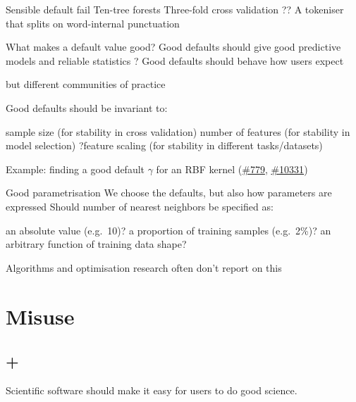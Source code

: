 \documentclass[aspectratio=169, 22pt]{beamer}
\newcommand{\issue}[1]{\href{https://github.com/scikit-learn/scikit-learn/issues/#1}{\##1}}
\newenvironment{sectionslide}
			{\subsection*{+}\begin{frame}[fragile,environment=sectionslide]\vfill\begin{center}\Large}
			{\end{center}\vfill\end{frame}}
\begin{document}
\begin{points}{Sensible default fail}
	\p Ten-tree forests
	\p Three-fold cross validation
	\p ?? A tokeniser that splits on word-internal punctuation
\end{points}

\begin{points}{What makes a default value good?}
	\p Good defaults should give good predictive models and reliable statistics
	\p ? Good defaults should behave how users expect
	\begin{itemize}
			\p but different communities of practice
	\end{itemize}
	\p Good defaults should be invariant to:
	\begin{itemize}
			\p sample size (for stability in cross validation)
			\p number of features (for stability in model selection)
			\p ?feature scaling (for stability in different tasks/datasets)
	\end{itemize}
	\p Example:	finding a good default $\gamma$ for an RBF kernel (\issue{779}, \issue{10331})
\end{points}

\begin{points}{Good parametrisation}
	\p We choose the defaults, but also how parameters are expressed
	\vfill
	\p Should number of nearest neighbors be specified as:
	\begin{itemize}
		\p an absolute value (e.g.\ 10)?
		\p a proportion of training samples (e.g.\ 2\%)?
		\p an arbitrary function of training data shape?
	\end{itemize}
	\vfill
	\p Algorithms and optimisation research often don't report on this
\end{points}

\section{Misuse} %


\begin{sectionslide}
Scientific software should make it easy for users to do good science.
\end{sectionslide}
\end{document}
